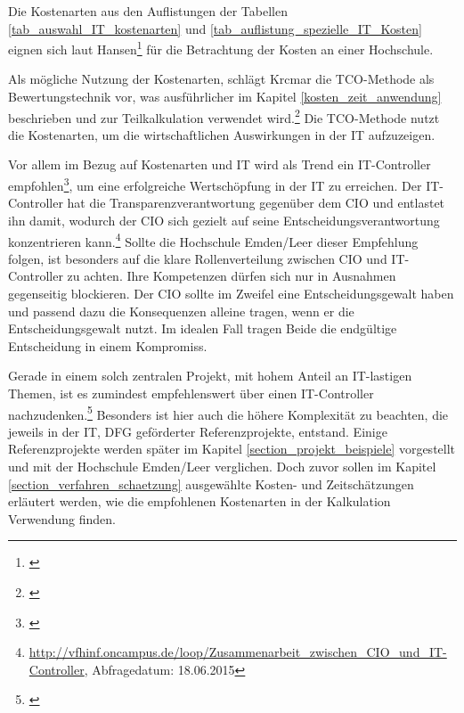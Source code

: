 Die Kostenarten aus den Auflistungen der Tabellen \ref{tab_auswahl_IT_kostenarten} und \ref{tab_auflistung_spezielle_IT_Kosten} eignen sich laut Hansen\footnote{\autocite[493-498]{hansen_business_2009}} für die Betrachtung der Kosten an einer Hochschule.

Als mögliche Nutzung der Kostenarten, schlägt Krcmar die TCO-Methode als Bewertungstechnik vor, was ausführlicher im Kapitel \ref{kosten_zeit_anwendung} beschrieben und zur Teilkalkulation verwendet wird.\footnote{\autocite[144]{krcmar_einfuhrung_2015}} Die TCO-Methode nutzt die Kostenarten, um die wirtschaftlichen Auswirkungen in der IT aufzuzeigen.

\clearpage

Vor allem im Bezug auf Kostenarten und IT wird als Trend ein IT-Controller empfohlen\footnote{\autocite[49]{gadatsch_masterkurs_2014}}, um eine erfolgreiche Wertschöpfung in der IT zu erreichen. Der IT-Controller hat die Transparenzverantwortung gegenüber dem CIO und entlastet ihn damit, wodurch der CIO sich gezielt auf seine Entscheidungsverantwortung konzentrieren kann.\footnote{\url{http://vfhinf.oncampus.de/loop/Zusammenarbeit_zwischen_CIO_und_IT-Controller}, Abfragedatum: 18.06.2015} Sollte die Hochschule Emden/Leer dieser Empfehlung folgen, ist besonders auf die klare Rollenverteilung zwischen CIO und IT-Controller zu achten. Ihre Kompetenzen dürfen sich nur in Ausnahmen gegenseitig blockieren. Der CIO sollte im Zweifel eine Entscheidungsgewalt haben und passend dazu die Konsequenzen alleine tragen, wenn er die Entscheidungsgewalt nutzt. Im idealen Fall tragen Beide die endgültige Entscheidung in einem Kompromiss.

Gerade in einem solch zentralen Projekt, mit hohem Anteil an IT-lastigen Themen, ist es zumindest empfehlenswert über einen IT-Controller nachzudenken.\footnote{\autocite[11-15]{stratmann_it_2013}} Besonders ist hier auch die höhere Komplexität zu beachten, die jeweils in der IT, DFG geförderter Referenzprojekte, entstand. Einige Referenzprojekte werden später im Kapitel \ref{section_projekt_beispiele} vorgestellt und mit der Hochschule Emden/Leer verglichen. Doch zuvor sollen im Kapitel \ref{section_verfahren_schaetzung} ausgewählte Kosten- und Zeitschätzungen erläutert werden, wie die empfohlenen Kostenarten in der Kalkulation Verwendung finden.

